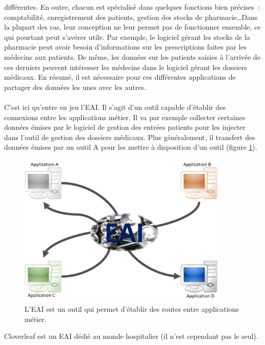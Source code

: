 			différentes. En outre, chacun est spécialisé dans quelques fonctions
			bien précises~: comptabilité, enregistrement des patients, gestion des
			stocks de pharmacie\ldots Dans la plupart des cas, leur conception ne leur
			permet pas de fonctionner ensemble, ce qui pourtant peut s'avérer utile. Par
			exemple, le logiciel gérant les stocks de la pharmacie peut avoir besoin
			d'informations sur les prescriptions faites par les médecins aux patients. De
			même, les données sur les patients saisies à l'arrivée de ces derniers
			peuvent intéresser les médecins dans le logiciel gérant les dossiers
			médicaux. En résumé, il est nécessaire pour ces différentes applications de
			partager des données les unes avec les autres.
			
			\paragraph{}%
			C'est ici qu'entre en jeu l'EAI. Il s'agit d'un outil capable d'établir des
			connexions entre les applications métier. Il va par exemple collecter
			certaines données émises par le logiciel de gestion des entrées patients
			pour les injecter dans l'outil de gestion des dossiers médicaux. Plus
			généralement, il transfert des données émises par un outil A pour les
			mettre à disposition d'un outil (figure \ref{intro_interop}).
			\begin{figure}[H]
				\centering
				\includegraphics[width=10cm]{../img/eai_1.png}
				\caption{\label{intro_interop} L'EAI est un outil qui permet
				d'établir des routes entre applications métier.}
			\end{figure}
			Cloverleaf est un EAI dédié au monde hospitalier (il n'est cependant pas le
			seul).
			
